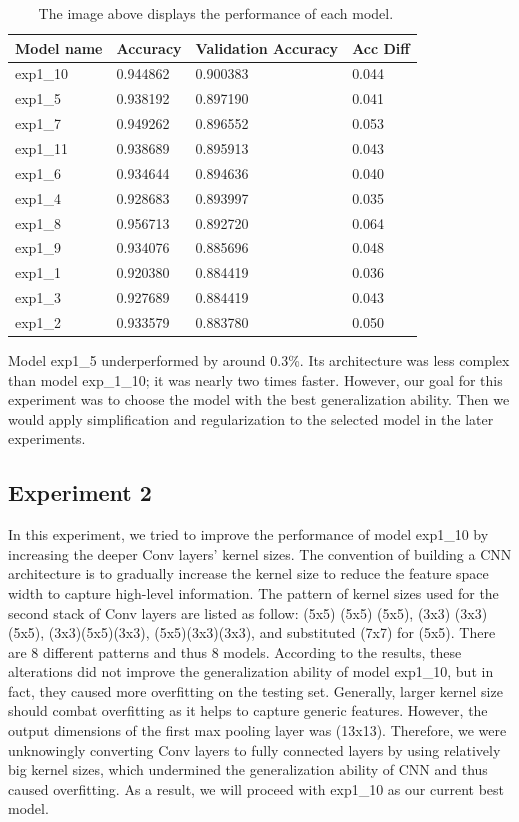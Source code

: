 \documentclass[twoside,twocolumn,9pt]{article}
\begin{document}
\begin{table}[h]
\small
  \caption{\ The image above displays the performance of each model.}
  \label{tbl:example1}
  \begin{tabular*}{0.48\textwidth}{@{\extracolsep{\fill}}llll}
    \hline
    Model name & Accuracy & Validation Accuracy & Acc Diff\\
    \hline
    exp1\_10 & 0.944862 & 0.900383 & 0.044\\
    exp1\_5 & 0.938192 & 0.897190 & 0.041\\
    exp1\_7 & 0.949262 & 0.896552 & 0.053\\
    exp1\_11 & 0.938689 & 0.895913 & 0.043\\
    exp1\_6 & 0.934644 & 0.894636 & 0.040\\
    exp1\_4 & 0.928683 & 0.893997 & 0.035\\
    exp1\_8 & 0.956713 & 0.892720 & 0.064\\
    exp1\_9 & 0.934076 & 0.885696 & 0.048\\
    exp1\_1 & 0.920380 & 0.884419 & 0.036\\
    exp1\_3 & 0.927689 & 0.884419 & 0.043\\
    exp1\_2 & 0.933579 & 0.883780 & 0.050\\
    \hline
  \end{tabular*}
\end{table}

\noindent Model exp1\_5 underperformed by around 0.3\%. Its architecture was less complex than model exp\_1\_10; it was nearly two times faster. However, our goal for this experiment was to choose the model with the best generalization ability. Then we would apply simplification and regularization to the selected model in the later experiments. 


\subsection{Experiment 2}

In this experiment, we tried to improve the performance of model exp1\_10 by increasing the deeper Conv layers’ kernel sizes. The convention of building a CNN architecture is to gradually increase the kernel size to reduce the feature space width to capture high-level information. The pattern of kernel sizes used for the second stack of Conv layers are listed as follow: (5x5) (5x5) (5x5), (3x3) (3x3) (5x5), (3x3)(5x5)(3x3), (5x5)(3x3)(3x3), and substituted (7x7) for (5x5). There are 8 different patterns and thus 8 models. According to the results, these alterations did not improve the generalization ability of model exp1\_10, but in fact, they caused more overfitting on the testing set. Generally, larger kernel size should combat overfitting as it helps to capture generic features. However, the output dimensions of the first max pooling layer was (13x13). Therefore, we were unknowingly converting Conv layers to fully connected layers by using relatively big kernel sizes, which undermined the generalization ability of CNN and thus caused overfitting. As a result, we will proceed with exp1\_10 as our current best model.
\end{document}
